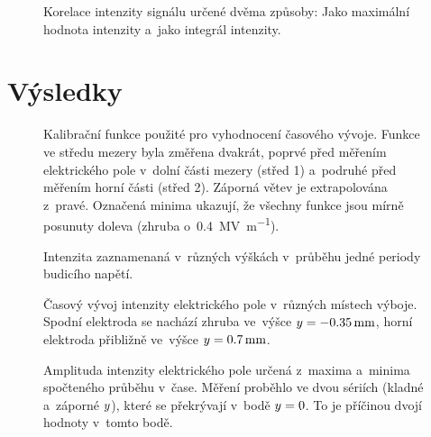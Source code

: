 \begin{figure}[htp]
	\centering
	
	\caption{Korelace intenzity signálu \EFISH{} určené dvěma způsoby:
		Jako maximální hodnota intenzity a~jako integrál intenzity.}
	\label{fig:efish-intmax}
\end{figure}

\section{Výsledky}
\label{sec:efish-results}

\begin{figure}
	\centering
	
	\caption{Kalibrační funkce použité pro vyhodnocení časového vývoje.
		Funkce ve středu mezery byla změřena dvakrát, poprvé před měřením
		elektrického pole v~dolní části mezery (střed 1)
		a~podruhé před měřením horní části (střed 2).
		Záporná větev je extrapolována z~pravé.
		Označená minima ukazují, že všechny funkce jsou mírně posunuty
		doleva (zhruba o~\SI{0.4}{\mega\volt\per\metre}).}
	\label{fig:efish-period-calib}
\end{figure}

\begin{figure}[htp]
	\centering
	
	\caption{Intenzita \EFISH{} zaznamenaná v~různých výškách
		v~průběhu jedné periody budicího napětí.}
	\label{fig:efish-period-efish}
\end{figure}

\begin{figure}[p]
	
	\caption{Časový vývoj intenzity elektrického pole
		v~různých místech výboje.
		Spodní elektroda se nachází zhruba ve~výšce
		$y = \SI{-0.35}{\milli\metre}$,
		horní elektroda přibližně ve~výšce
		$y = \SI{0.7}{\milli\metre}$.}
\end{figure}

\begin{figure}[htp]
	\centering
	
	\caption{Amplituda intenzity elektrického pole určená z~maxima
		a~minima spočteného průběhu v~čase.
		Měření proběhlo ve dvou sériích (kladné a~záporné $y$),
		které se překrývají v~bodě $y = 0$.
		To je příčinou dvojí hodnoty v~tomto bodě.}
	\label{fig:efish-period-amplitude}
\end{figure}
